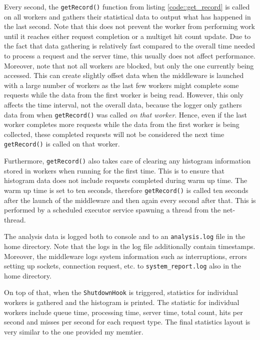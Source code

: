 \documentclass[11pt,a4paper]{article}
\begin{document}
Every second, the \texttt{getRecord()} function from listing \ref{code::get_record} is called on all workers and gathers their statistical data to output what has happened in the last second. Note that this does not prevent the worker from performing work until it reaches either request completion or a multiget hit count update. Due to the fact that data gathering is relatively fast compared to the overall time needed to process a request and the server time, this usually does not affect performance. Moreover, note that not all workers are blocked, but only the one currently being accessed. This can create slightly offset data when the middleware is launched with a large number of workers as the last few workers might complete some requests while the data from the first worker is being read. However, this only affects the time interval, not the overall data, because the logger only gathers data from when \texttt{getRecord()} was called \textit{on that worker}. Hence, even if the last worker completes more requests while the data from the first worker is being collected, these completed requests will not be considered the next time \texttt{getRecord()} is called on that worker.

Furthermore, \texttt{getRecord()} also takes care of clearing any histogram information stored in workers when running for the first time. This is to ensure that histogram data does not include requests completed during warm up time. The warm up time is set to ten seconds, therefore \texttt{getRecord()} is called ten seconds after the launch of the middleware and then again every second after that. This is performed by a scheduled executor service spawning a thread from the net-thread.

The analysis data is logged both to console and to an \texttt{analysis.log} file in the home directory. Note that the logs in the log file additionally contain timestamps. Moreover, the middleware logs system information such as interruptions, errors setting up sockets, connection request, etc. to \texttt{system_report.log} also in the home directory.

On top of that, when the \texttt{ShutdownHook} is triggered, statistics for individual workers is gathered and the histogram is printed. The statistic for individual workers include queue time, processing time, server time, total count, hits per second and misses per second for each request type. The final statistics layout is very similar to the one provided my memtier.
\end{document}
